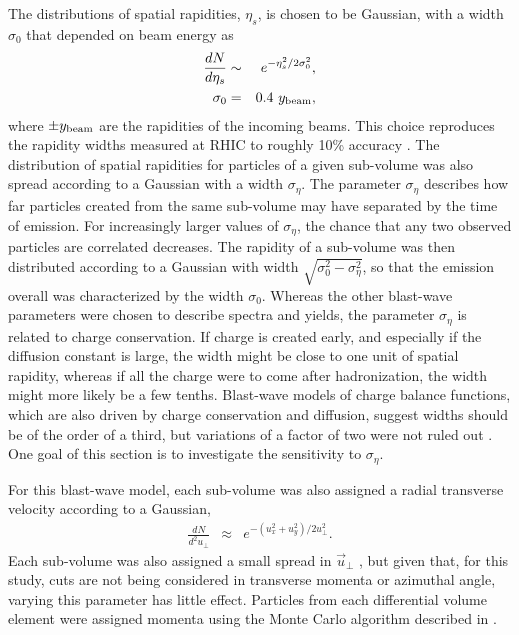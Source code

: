 The distributions of spatial rapidities, $\eta_s$, is chosen to be Gaussian, with a width $\sigma_0$ that depended on beam energy as
\begin{eqnarray}
\frac{dN}{d\eta_s}&\sim& e^{-\eta_s^2/2\sigma_0^2},\\
\nonumber
\sigma_0&=&0.4~y_{\rm beam},
\end{eqnarray}
where $\pm y_{\rm beam}$ are the rapidities of the incoming beams. This choice reproduces the rapidity widths measured at RHIC to roughly 10\% accuracy \cite{Flores:2016mtp}. The distribution of spatial rapidities for particles of a given sub-volume was also spread according to a Gaussian with a width $\sigma_\eta$. The parameter $\sigma_\eta$ describes how far particles created from the same sub-volume may have separated by the time of emission. For increasingly larger values of $\sigma_\eta$, the chance that any two observed particles are correlated decreases. The rapidity of a sub-volume was then distributed according to a Gaussian with width $\sqrt{\sigma_0^2-\sigma_\eta^2}$, so that the emission overall was characterized by the width $\sigma_0$. Whereas the other blast-wave parameters were chosen to describe spectra and yields, the parameter $\sigma_\eta$ is related to charge conservation. If charge is created early, and especially if the diffusion constant is large, the width might be close to one unit of spatial rapidity, whereas if all the charge were to come after hadronization, the width might more likely be a few tenths. Blast-wave models of charge balance functions, which are also driven by charge conservation and diffusion, suggest widths should be of the order of a third, but variations of a factor of two were not ruled out \cite{Schlichting:2010qia}. One goal of this section is to investigate the sensitivity to $\sigma_\eta$.

For this blast-wave model, each sub-volume was also assigned a radial transverse velocity according to a Gaussian,
\begin{eqnarray}
\frac{dN}{d^2u_\perp}&\approx&e^{-(u_x^2+u_y^2)/2u_\perp^2}.
\end{eqnarray}
Each sub-volume was also assigned a small spread in $\vec{u}_\perp$ , but given that, for this study, cuts are not being considered in transverse momenta or azimuthal angle, varying this parameter has little effect. Particles from each differential volume element were assigned momenta using the Monte Carlo algorithm described in \cite{Pratt:2010jt}.

